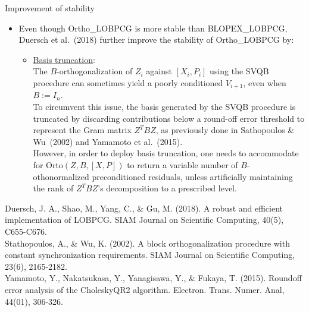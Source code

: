 \documentclass[t,usepdftitle=false]{beamer}
\begin{document}
\begin{frame}{Improvement of stability}
	\begin{itemize}
	\item Even though Ortho\_LOBPCG is more stable than BLOPEX\_LOBPCG, Duersch et al.~(2018) further improve the stability of Ortho\_LOBPCG by:
	\begin{itemize}
	\item\underline{Basis truncation}:\tinyskip\\
	The $B$-orthogonalization of $Z_i$ against $[X_i,P_i]$ using the SVQB procedure can sometimes yield a poorly conditioned $V_{i+1}$, even when $B:=I_n$.\smallskip\\
	To circumvent this issue, the basis generated by the SVQB procedure is truncated by discarding contributions below a round-off error threshold to represent the Gram matrix $Z^TBZ$, as previously done in Sathopoulos \& Wu~(2002) and Yamamoto et al.~(2015).\smallskip\\
	However, in order to deploy basis truncation, one needs to accommodate for $\text{Orto}(Z,B,[X,P])$ to return a variable number of $B$-othonormalized preconditioned residuals, unless artificially maintaining the rank of $Z^TBZ$'s decomposition to a prescribed level.
	\end{itemize}
	\end{itemize}	
	\smallskip
	\tiny{Duersch, J. A., Shao, M., Yang, C., \& Gu, M. (2018). A robust and efficient implementation of LOBPCG. SIAM Journal on Scientific Computing, 40(5), C655-C676.}\tinyskip\\
	\tiny{Stathopoulos, A., \& Wu, K. (2002). A block orthogonalization procedure with constant synchronization requirements. SIAM Journal on Scientific Computing, 23(6), 2165-2182.}\tinyskip\\
	\tiny{Yamamoto, Y., Nakatsukasa, Y., Yanagisawa, Y., \& Fukaya, T. (2015). Roundoff error analysis of the CholeskyQR2 algorithm. Electron. Trans. Numer. Anal, 44(01), 306-326.}
\end{frame}
\end{document}

